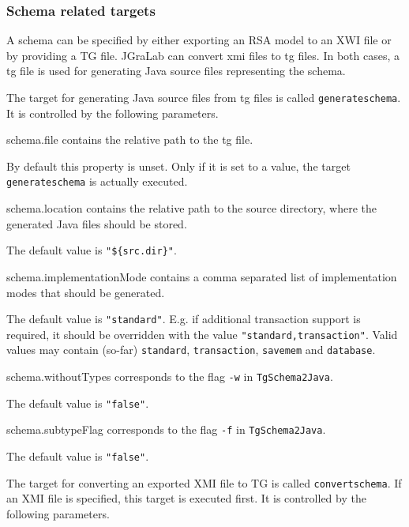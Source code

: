 \documentclass[a4paper,twoside,11pt,bibtotoc]{article}
\begin{document}
\subsubsection{Schema related targets}
A schema can be specified by either exporting an RSA model to an XWI file or by providing a TG file.
JGraLab can convert xmi files to tg files.
In both cases, a tg file is used for generating Java source files representing the schema.

The target for generating Java source files from tg files is called \texttt{generateschema}.
It is controlled by the following parameters.

\begin{description*}
	\item[schema.file] contains the relative path to the tg file.\par By default this property is unset. Only if it is set to a value, the target \texttt{generateschema} is actually executed.
	\item[schema.location] contains the relative path to the source directory, where the generated Java files should be stored.\par The default value is \texttt{"\$\{src.dir\}"}.
	\item[schema.implementationMode] contains a comma separated list of implementation modes that should be generated.\par The default value is \texttt{"standard"}. E.g. if additional transaction support is required, it should be overridden with the value \texttt{"standard,transaction"}. Valid values may contain (so-far) \texttt{standard}, \texttt{transaction}, \texttt{savemem} and \texttt{database}.
	\item[schema.withoutTypes] corresponds to the flag \texttt{-w} in \texttt{TgSchema2Java}.\par The default value is \texttt{"false"}.
	\item[schema.subtypeFlag] corresponds to the flag \texttt{-f} in \texttt{TgSchema2Java}.\par The default value is \texttt{"false"}.
\end{description*}

The target for converting an exported XMI file to TG is called \texttt{convertschema}.
If an XMI file is specified, this target is executed first.
It is controlled by the following parameters.
\end{document}
